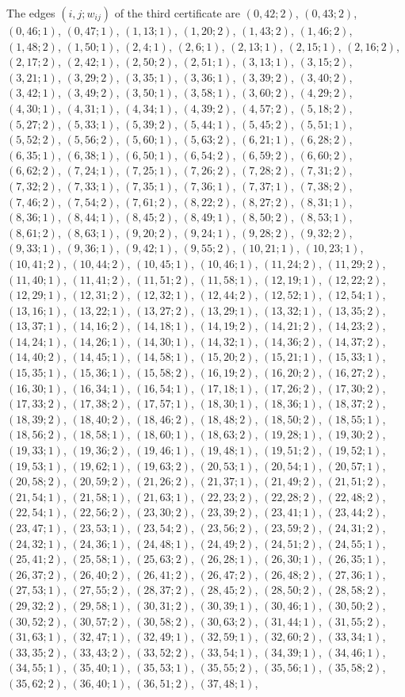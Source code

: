\documentclass[11pt]{article}
\begin{document}
The edges $(i,j;w_{ij})$ of the third certificate are $(0,42;2)$, $(0,43;2)$, $(0,46;1)$, $(0,47;1)$, $(1,13;1)$, $(1,20;2)$, $(1,43;2)$, $(1,46;2)$, $(1,48;2)$, $(1,50;1)$, $(2,4;1)$, $(2,6;1)$, $(2,13;1)$, $(2,15;1)$, $(2,16;2)$, $(2,17;2)$, $(2,42;1)$, $(2,50;2)$, $(2,51;1)$, $(3,13;1)$, $(3,15;2)$, $(3,21;1)$, $(3,29;2)$, $(3,35;1)$, $(3,36;1)$, $(3,39;2)$, $(3,40;2)$, $(3,42;1)$, $(3,49;2)$, $(3,50;1)$, $(3,58;1)$, $(3,60;2)$, $(4,29;2)$, $(4,30;1)$, $(4,31;1)$, $(4,34;1)$, $(4,39;2)$, $(4,57;2)$, $(5,18;2)$, $(5,27;2)$, $(5,33;1)$, $(5,39;2)$, $(5,44;1)$, $(5,45;2)$, $(5,51;1)$, $(5,52;2)$, $(5,56;2)$, $(5,60;1)$, $(5,63;2)$, $(6,21;1)$, $(6,28;2)$, $(6,35;1)$, $(6,38;1)$, $(6,50;1)$, $(6,54;2)$, $(6,59;2)$, $(6,60;2)$, $(6,62;2)$, $(7,24;1)$, $(7,25;1)$, $(7,26;2)$, $(7,28;2)$, $(7,31;2)$, $(7,32;2)$, $(7,33;1)$, $(7,35;1)$, $(7,36;1)$, $(7,37;1)$, $(7,38;2)$, $(7,46;2)$, $(7,54;2)$, $(7,61;2)$, $(8,22;2)$, $(8,27;2)$, $(8,31;1)$, $(8,36;1)$, $(8,44;1)$, $(8,45;2)$, $(8,49;1)$, $(8,50;2)$, $(8,53;1)$, $(8,61;2)$, $(8,63;1)$, $(9,20;2)$, $(9,24;1)$, $(9,28;2)$, $(9,32;2)$, $(9,33;1)$, $(9,36;1)$, $(9,42;1)$, $(9,55;2)$, $(10,21;1)$, $(10,23;1)$, $(10,41;2)$, $(10,44;2)$, $(10,45;1)$, $(10,46;1)$, $(11,24;2)$, $(11,29;2)$, $(11,40;1)$, $(11,41;2)$, $(11,51;2)$, $(11,58;1)$, $(12,19;1)$, $(12,22;2)$, $(12,29;1)$, $(12,31;2)$, $(12,32;1)$, $(12,44;2)$, $(12,52;1)$, $(12,54;1)$, $(13,16;1)$, $(13,22;1)$, $(13,27;2)$, $(13,29;1)$, $(13,32;1)$, $(13,35;2)$, $(13,37;1)$, $(14,16;2)$, $(14,18;1)$, $(14,19;2)$, $(14,21;2)$, $(14,23;2)$, $(14,24;1)$, $(14,26;1)$, $(14,30;1)$, $(14,32;1)$, $(14,36;2)$, $(14,37;2)$, $(14,40;2)$, $(14,45;1)$, $(14,58;1)$, $(15,20;2)$, $(15,21;1)$, $(15,33;1)$, $(15,35;1)$, $(15,36;1)$, $(15,58;2)$, $(16,19;2)$, $(16,20;2)$, $(16,27;2)$, $(16,30;1)$, $(16,34;1)$, $(16,54;1)$, $(17,18;1)$, $(17,26;2)$, $(17,30;2)$, $(17,33;2)$, $(17,38;2)$, $(17,57;1)$, $(18,30;1)$, $(18,36;1)$, $(18,37;2)$, $(18,39;2)$, $(18,40;2)$, $(18,46;2)$, $(18,48;2)$, $(18,50;2)$, $(18,55;1)$, $(18,56;2)$, $(18,58;1)$, $(18,60;1)$, $(18,63;2)$, $(19,28;1)$, $(19,30;2)$, $(19,33;1)$, $(19,36;2)$, $(19,46;1)$, $(19,48;1)$, $(19,51;2)$, $(19,52;1)$, $(19,53;1)$, $(19,62;1)$, $(19,63;2)$, $(20,53;1)$, $(20,54;1)$, $(20,57;1)$, $(20,58;2)$, $(20,59;2)$, $(21,26;2)$, $(21,37;1)$, $(21,49;2)$, $(21,51;2)$, $(21,54;1)$, $(21,58;1)$, $(21,63;1)$, $(22,23;2)$, $(22,28;2)$, $(22,48;2)$, $(22,54;1)$, $(22,56;2)$, $(23,30;2)$, $(23,39;2)$, $(23,41;1)$, $(23,44;2)$, $(23,47;1)$, $(23,53;1)$, $(23,54;2)$, $(23,56;2)$, $(23,59;2)$, $(24,31;2)$, $(24,32;1)$, $(24,36;1)$, $(24,48;1)$, $(24,49;2)$, $(24,51;2)$, $(24,55;1)$, $(25,41;2)$, $(25,58;1)$, $(25,63;2)$, $(26,28;1)$, $(26,30;1)$, $(26,35;1)$, $(26,37;2)$, $(26,40;2)$, $(26,41;2)$, $(26,47;2)$, $(26,48;2)$, $(27,36;1)$, $(27,53;1)$, $(27,55;2)$, $(28,37;2)$, $(28,45;2)$, $(28,50;2)$, $(28,58;2)$, $(29,32;2)$, $(29,58;1)$, $(30,31;2)$, $(30,39;1)$, $(30,46;1)$, $(30,50;2)$, $(30,52;2)$, $(30,57;2)$, $(30,58;2)$, $(30,63;2)$, $(31,44;1)$, $(31,55;2)$, $(31,63;1)$, $(32,47;1)$, $(32,49;1)$, $(32,59;1)$, $(32,60;2)$, $(33,34;1)$, $(33,35;2)$, $(33,43;2)$, $(33,52;2)$, $(33,54;1)$, $(34,39;1)$, $(34,46;1)$, $(34,55;1)$, $(35,40;1)$, $(35,53;1)$, $(35,55;2)$, $(35,56;1)$, $(35,58;2)$, $(35,62;2)$, $(36,40;1)$, $(36,51;2)$, $(37,48;1)$, 
\end{document}
